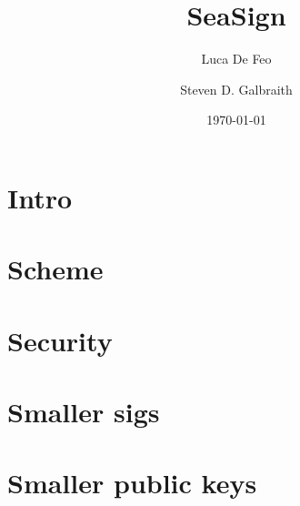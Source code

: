 \documentclass{llncs}
\title{SeaSign}
\author{Luca De Feo \and Steven D. Galbraith}
\date{\today}
\begin{document}
\pagestyle{plain}

\maketitle


\begin{abstract}

\end{abstract}



\section{Intro}

\section{Scheme}


\section{Security}


\section{Smaller sigs}

\section{Smaller public keys}




\end{document}
